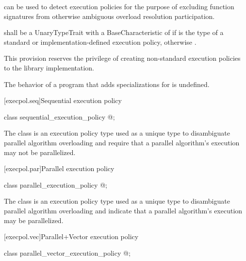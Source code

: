 \begin{itemdescr}
\pnum
{} can be used to detect execution policies for the purpose of excluding function signatures from otherwise ambiguous overload resolution participation.

\pnum
{} shall be a UnaryTypeTrait with a
BaseCharacteristic of  if  is the type of a standard
or implementation-defined execution policy, otherwise .

\enternote
This provision reserves the privilege of creating non-standard execution
policies to the library implementation.
\exitnote

\pnum
The behavior of a program that adds specializations for
 is undefined.
\end{itemdescr}

[execpol.seq]{Sequential execution policy}

%
\begin{itemdecl}
class sequential_execution_policy { @\unspec@ };
\end{itemdecl}

\begin{itemdescr}
\pnum
The class  is an execution policy type used
as a unique type to disambiguate parallel algorithm overloading and require
that a parallel algorithm's execution may not be parallelized.
\end{itemdescr}

[execpol.par]{Parallel execution policy}

%
\begin{itemdecl}
class parallel_execution_policy { @\unspec@ };
\end{itemdecl}

\begin{itemdescr}
\pnum
The class  is an execution policy type used as
a unique type to disambiguate parallel algorithm overloading and indicate that
a parallel algorithm's execution may be parallelized.
\end{itemdescr}

[execpol.vec]{Parallel+Vector execution policy}

%
\begin{itemdecl}
class parallel_vector_execution_policy { @\unspec@ };
\end{itemdecl}

